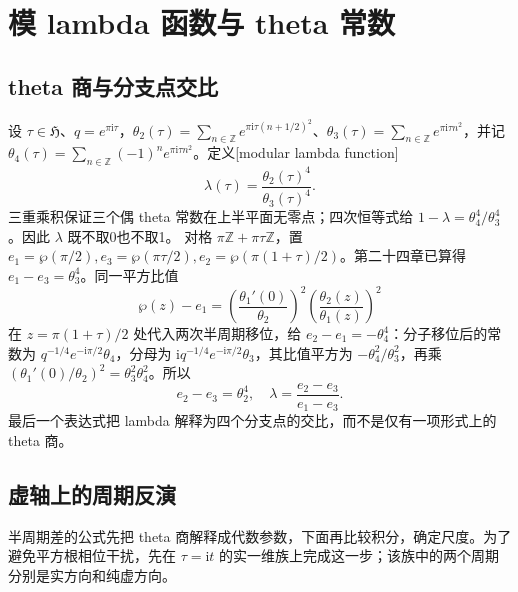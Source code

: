 \section{模 lambda 函数与 theta 常数}
\label{b3:sec:F05}

\subsection{theta 商与分支点交比}
\label{b3:subsec:F0501}

设 \(\tau\in\mathfrak H\)、\(q=e^{\pi\mathrm{i}\tau}\)，\(\theta_2(\tau)=\sum_{n\in\mathbb Z}e^{\pi\mathrm{i}\tau(n+1/2)^2}\)、\(\theta_3(\tau)=\sum_{n\in\mathbb Z}e^{\pi\mathrm{i}\tau n^2}\)，并记 \(\theta_4(\tau)=\sum_{n\in\mathbb Z}(-1)^n e^{\pi\mathrm{i}\tau n^2}\)。定义[modular lambda function]
\[
 \lambda(\tau)=\frac{\theta_2(\tau)^4}{\theta_3(\tau)^4}.
\]
三重乘积保证三个偶 theta 常数在上半平面无零点；四次恒等式给 \(1-\lambda=\theta_4^4/\theta_3^4\)。因此 \(\lambda\) 既不取0也不取1。
\ProseParagraphBreak
对格 \(\pi\mathbb Z+\pi\tau\mathbb Z\)，置
\(e_1=\wp(\pi/2),e_3=\wp(\pi\tau/2),e_2=\wp(\pi(1+\tau)/2)\)。第二十四章已算得 \(e_1-e_3=\theta_3^4\)。同一平方比值
\[
 \wp(z)-e_1=\left(\frac{\theta_1'(0)}{\theta_2}\right)^2
                      \left(\frac{\theta_2(z)}{\theta_1(z)}\right)^2
\]
在 \(z=\pi(1+\tau)/2\) 处代入两次半周期移位，给 \(e_2-e_1=-\theta_4^4\)：分子移位后的常数为 \(q^{-1/4}e^{-\mathrm{i}\pi/2}\theta_4\)，分母为 \(\mathrm{i}q^{-1/4}e^{-\mathrm{i}\pi/2}\theta_3\)，其比值平方为 \(-\theta_4^2/\theta_3^2\)，再乘 \((\theta_1'(0)/\theta_2)^2=\theta_3^2\theta_4^2\)。所以
\[
 e_2-e_3=\theta_2^4,\quad
 \lambda=\frac{e_2-e_3}{e_1-e_3}.
\]
最后一个表达式把 lambda 解释为四个分支点的交比，而不是仅有一项形式上的 theta 商。

\subsection{虚轴上的周期反演}
\label{b3:subsec:F0502}

半周期差的公式先把 theta 商解释成代数参数，下面再比较积分，确定尺度。为了避免平方根相位干扰，先在 \(\tau=\mathrm{i}t\) 的实一维族上完成这一步；该族中的两个周期分别是实方向和纯虚方向。

